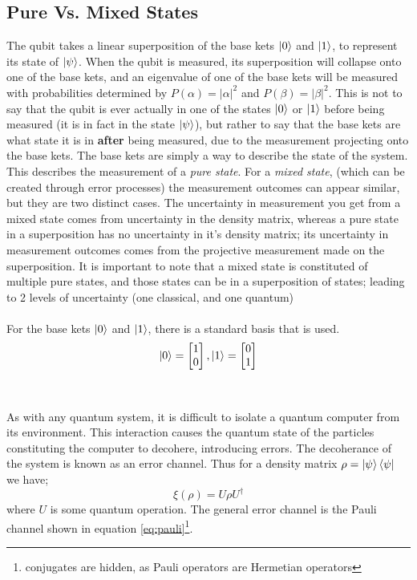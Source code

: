 \subsection*{Pure Vs. Mixed States}
The qubit takes a linear superposition of the base kets $\ket{0}$ and $\ket{1}$, to represent its state of $\ket{\psi}$. When the qubit is measured, its superposition will collapse onto one of the base kets, and an eigenvalue of one of the base kets will be measured with probabilities determined by $P(\alpha)=|\alpha|^2$ and $P(\beta)=|\beta|^2$. This is not to say that the qubit is ever actually in one of the states $\ket{0}$ or $\ket{1}$ before being measured (it is in fact in the state $\ket{\psi}$), but rather to say that the base kets are what state it is in \textbf{after} being measured, due to the measurement projecting onto the base kets. The base kets are simply a way to describe the state of the system. This describes the measurement of a \textit{pure state}. For a \textit{mixed state}, (which can be created through error processes) the measurement outcomes can appear similar, but they are two distinct cases. The uncertainty in measurement you get from a mixed state comes from uncertainty in the density matrix, whereas a pure state in a superposition has no uncertainty in it's density matrix; its uncertainty in measurement outcomes comes from the projective measurement made on the superposition. It is important to note that a mixed state is constituted of multiple pure states, and those states can be in a superposition of states; leading to 2 levels of uncertainty (one classical, and one quantum)
\\\\
For the base kets $\ket{0}$ and $\ket{1}$, there is a standard basis that is used. 
\[
\ket{0} = 
\begin{bmatrix}
1 \\
0 
\end{bmatrix},
\ket{1} = 
\begin{bmatrix}
0 \\
1 
\end{bmatrix}
\]
\\\\
As with any quantum system, it is difficult to isolate a quantum computer from its environment. This interaction causes the quantum state of the particles constituting the computer to decohere, introducing errors. 
The decoherance of the system is known as an error channel. Thus for a density matrix $\rho = \ket{\psi}\bra{\psi}$ we have;
$$\xi (\rho) = U\rho U^\dagger $$
where $U$ is some quantum operation. The general error channel is the Pauli channel shown in equation \ref{eq:pauli}\footnote{conjugates are hidden, as Pauli operators are Hermetian operators}.
